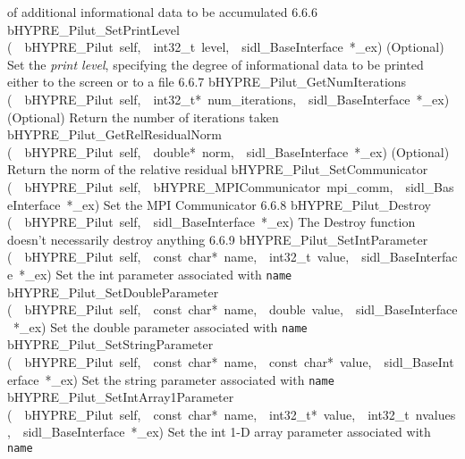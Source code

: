 \documentclass{article}
\begin{document}
\begin{cxxentry}
\begin{cxxentry}
\begin{cxxnames}
{of additional informational data to be accumulated}
        {6.6.6}
        {bHYPRE\_Pilut\_SetPrintLevel}
        {(\ \ bHYPRE\_Pilut\ self,\ \ int32\_t\ level,\ \ sidl\_BaseInterface\ *\_ex)}
        {
(Optional) Set the {\it print level}, specifying the degree
of informational data to be printed either to the screen or
to a file}
        {6.6.7}
        {bHYPRE\_Pilut\_GetNumIterations}
        {(\ \ bHYPRE\_Pilut\ self,\ \ int32\_t*\ num\_iterations,\ \ sidl\_BaseInterface\ *\_ex)}
        {
(Optional) Return the number of iterations taken}
        {}
\label{cxx.6.6.15}
        {bHYPRE\_Pilut\_GetRelResidualNorm}
        {(\ \ bHYPRE\_Pilut\ self,\ \ double*\ norm,\ \ sidl\_BaseInterface\ *\_ex)}
        {
(Optional) Return the norm of the relative residual}
        {}
\label{cxx.6.6.16}
        {bHYPRE\_Pilut\_SetCommunicator}
        {(\ \ bHYPRE\_Pilut\ self,\ \ bHYPRE\_MPICommunicator\ mpi\_comm,\ \ sidl\_BaseInterface\ *\_ex)}
        {
Set the MPI Communicator}
        {6.6.8}
        {bHYPRE\_Pilut\_Destroy}
        {(\ \ bHYPRE\_Pilut\ self,\ \ sidl\_BaseInterface\ *\_ex)}
        {
The Destroy function doesn't necessarily destroy anything}
        {6.6.9}
        {bHYPRE\_Pilut\_SetIntParameter}
        {(\ \ bHYPRE\_Pilut\ self,\ \ const\ char*\ name,\ \ int32\_t\ value,\ \ sidl\_BaseInterface\ *\_ex)}
        {
Set the int parameter associated with {\tt name}}
        {}
\label{cxx.6.6.17}
        {bHYPRE\_Pilut\_SetDoubleParameter}
        {(\ \ bHYPRE\_Pilut\ self,\ \ const\ char*\ name,\ \ double\ value,\ \ sidl\_BaseInterface\ *\_ex)}
        {
Set the double parameter associated with {\tt name}}
        {}
\label{cxx.6.6.18}
        {bHYPRE\_Pilut\_SetStringParameter}
        {(\ \ bHYPRE\_Pilut\ self,\ \ const\ char*\ name,\ \ const\ char*\ value,\ \ sidl\_BaseInterface\ *\_ex)}
        {
Set the string parameter associated with {\tt name}}
        {}
\label{cxx.6.6.19}
        {bHYPRE\_Pilut\_SetIntArray1Parameter}
        {(\ \ bHYPRE\_Pilut\ self,\ \ const\ char*\ name,\ \ int32\_t*\ value,\ \ int32\_t\ nvalues,\ \ sidl\_BaseInterface\ *\_ex)}
        {
Set the int 1-D array parameter associated with {\tt name}}
        {}
\label{cxx.6.6.20}

\end{cxxnames}
\end{cxxentry}
\end{cxxentry}
\end{document}
